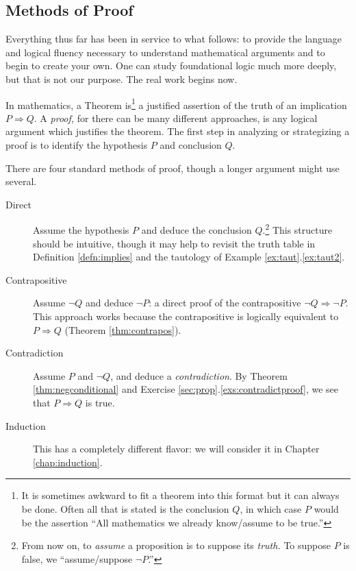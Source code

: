 \clearpage



\subsection{Methods of Proof}\label{sec:proof}

Everything thus far has been in service to what follows: to provide the language and logical fluency necessary to understand mathematical arguments and to begin to create your own. One can study foundational logic much more deeply, but that is not our purpose. The real work begins now.\medbreak

In mathematics, a Theorem is\footnote{It is sometimes awkward to fit a theorem into this format but it can always be done. Often all that is stated is the conclusion $Q$, in which case $P$ would be the assertion ``All mathematics we already know/assume to be true.''} a justified assertion of the truth of an implication $P\Longrightarrow Q$. A \emph{proof,} for there can be many different approaches, is any logical argument which justifies the theorem. The first step in analyzing or strategizing a proof is to identify the hypothesis $P$ and conclusion $Q$.\medbreak 

There are four standard methods of proof, though a longer argument might use several.
\begin{description}
	\item[Direct] Assume the hypothesis $P$ and deduce the conclusion $Q$.\footnote{From now on, to \emph{assume} a proposition is to suppose its \emph{truth.} To suppose $P$ is false, we ``assume/suppose $\neg P$.''} This structure should be intuitive, though it may help to revisit the truth table in Definition \ref{defn:implies} and the tautology of Example \ref*{ex:taut}.\ref{ex:taut2}.
	\item[Contrapositive] Assume $\neg Q$ and deduce $\neg P$: a direct proof of the contrapositive $\neg Q\Longrightarrow\neg P$. This approach works because the contrapositive is logically equivalent to $P\Longrightarrow Q$ (Theorem \ref{thm:contrapos}).
	\item[Contradiction] Assume $P$ and $\neg Q$, and deduce a \emph{contradiction}. By Theorem \ref{thm:negconditional} and Exercise \ref*{sec:prop}.\ref{exs:contradictproof}, we see that $P\Longrightarrow Q$ is true.
	\item[Induction] This has a completely different flavor: we will consider it in Chapter \ref{chap:induction}.
\end{description}

